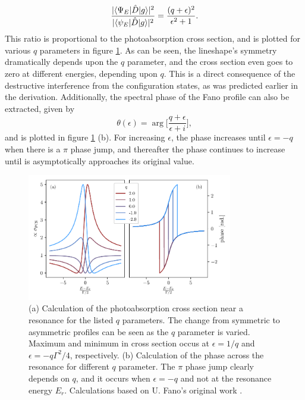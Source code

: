 \begin{equation}
\label{eqn:transition_prob_ratio}
	\frac{\lvert \braket{\Psi_E|\hat{D}|g} \rvert^2}{\lvert \braket{\psi_E|\hat{D}|g} \rvert^2}=\frac{(q+\epsilon)^2}{\epsilon^2 + 1}.
\end{equation}
This ratio is proportional to the photoabsorption cross section, and is plotted for various $q$ parameters in figure \ref{fig:cross_sec_and_phase}.  As can be seen, the lineshape's symmetry dramatically depends upon the $q$ parameter, and the cross section even goes to zero at different energies, depending upon $q$. This is a direct consequence of the destructive interference from the configuration states, as was predicted earlier in the derivation. Additionally, the spectral phase of the Fano profile can also be extracted, given by 
\begin{equation}
	\theta(\epsilon)=\arg\bigg[\frac{q+\epsilon}{\epsilon+i}\bigg],
\end{equation}
and is plotted in figure \ref{fig:cross_sec_and_phase} (b).  For increasing $\epsilon$, the phase increases until $\epsilon=-q$ when there is a $\pi$ phase jump, and thereafter the phase continues to increase until is asymptotically approaches its original value.
\begin{figure}
	\centering
	\includegraphics[width=0.8\textwidth]{figures/ATS/cs_phase.pdf}
	\caption{(a) Calculation of the photoabsorption cross section near a resonance for the listed $q$ parameters.  The change from symmetric to asymmetric profiles can be seen as the $q$ parameter is varied. Maximum and minimum in cross section occus at $\epsilon=1/q$ and $\epsilon=-q\Gamma^2/4$, respectively. (b) Calculation of the phase across the resonance for different $q$ parameter. The $\pi$ phase jump clearly depends on $q$, and it occurs when $\epsilon=-q$ and not at the resonance energy $E_r$. Calculations based on U. Fano's original work \cite{fanoEffectsConfigurationInteraction1961}.}
	\label{fig:cross_sec_and_phase}
\end{figure}

